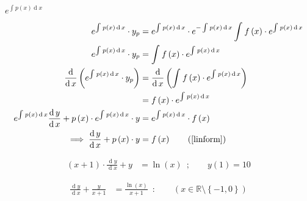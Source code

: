 \documentclass{report}
\def\lthtmlcheckvsize{\ifdim\ht\sizebox<\vsize 
  \ifdim\wd\sizebox<\hsize\expandafter\hfill\fi \expandafter\vfill
  \else\expandafter\vss\fi}%
\begin{document}
{\newpage\clearpage
{}%
$e^{\int^{}_{} p\left( x \right)  \operatorname{d}x }$%
\lthtmlindisplaymathZ
\lthtmlcheckvsize\clearpage}

{\newpage\clearpage
{}%
\begin{align}

  e^{\int^{}_{} p\left( x \right)  \operatorname{d}x }\cdot  y_p&= e^{\int^{}_{} p\left( x \right)  \operatorname{d}x } \cdot  e^{- \int^{}_{} p\left( x \right)  \operatorname{d}x } \int^{}_{} f\left( x \right)\cdot  e^{\int^{}_{} p\left( x \right)  \operatorname{d}x }  \notag \\
  e^{\int^{}_{} p\left( x \right)  \operatorname{d}x }\cdot  y_p&=  \int^{}_{} f\left( x \right)\cdot  e^{\int^{}_{} p\left( x \right)  \operatorname{d}x } \notag \\
\frac{\operatorname{d} }{\operatorname{d} x}\left(   e^{\int^{}_{} p\left( x \right)  \operatorname{d}x }\cdot  y_p \right) &=  \frac{\operatorname{d} }{\operatorname{d} x}\left(  \int^{}_{} f\left( x \right)\cdot  e^{\int^{}_{} p\left( x \right)  \operatorname{d}x }  
 \right)\notag \\
 &= f\left( x \right)\cdot  e^{\int^{}_{} p\left( x \right)  \operatorname{d}x } \notag \\
 e^{\int^{}_{} p\left( x \right)  \operatorname{d}x } \frac{\operatorname{d}y }{\operatorname{d} x} + p\left( x \right)\cdot  e^{\int^{}_{} p\left( x \right)  \operatorname{d}x } \cdot  y &=  e^{\int^{}_{} p\left( x \right)  \operatorname{d}x } \cdot  f \left( x \right) \notag \\
 \implies  \frac{\operatorname{d}y }{\operatorname{d} x}   + p\left( x \right)\cdot  y &= f \left( x \right) \tag{\ref{linform}}
\end{align}%
\lthtmlfigureZ
\lthtmlcheckvsize\clearpage}

{\newpage\clearpage
{}%
\begin{align}
  \left( x+ 1 \right)\cdot  \frac{\operatorname{d}y }{\operatorname{d} x}+ y&= \ln{ \left( x \right) } \enspace ; \qquad y(1)= 10
\end{align}%
\lthtmlfigureZ
\lthtmlcheckvsize\clearpage}

{\newpage\clearpage
{}%
\begin{align}
  \frac{\operatorname{d}y }{\operatorname{d} x}+ \frac{y}{x+ 1} &=  \frac{\ln{ \left( x \right) }}{x+ 1} \enspace : \qquad \left( x\in \mathbb{R} \setminus \left\{-1,0\right\} \right)
\end{align}%
\lthtmlfigureZ
\lthtmlcheckvsize\clearpage}
\end{document}
